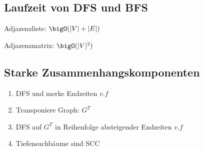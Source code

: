 \subsection*{Laufzeit von DFS und BFS}
Adjazenzliste: $\bigO(|V|+|E|)$

Adjazenzmatrix: $\bigO(|V|^2)$

\subsection*{Starke Zusammenhangskomponenten}
\begin{enumerate}
	\item DFS und merke Endzeiten $v.f$
	\item Transponiere Graph: $G^T$
	\item DFS auf $G^T$ in Reihenfolge absteigender Endzeiten $v.f$
	\item Tiefensuchbäume sind SCC
\end{enumerate}
